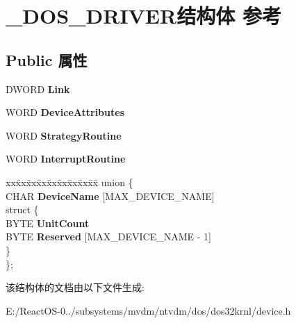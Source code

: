 \hypertarget{struct___d_o_s___d_r_i_v_e_r}{}\section{\+\_\+\+D\+O\+S\+\_\+\+D\+R\+I\+V\+E\+R结构体 参考}
\label{struct___d_o_s___d_r_i_v_e_r}
\subsection*{Public 属性}
\begin{DoxyCompactItemize}
\item 
\mbox{\label{struct___d_o_s___d_r_i_v_e_r_a3cf2f1cfe956b85175f57a898467bd11}} 
D\+W\+O\+RD {\bfseries Link}
\item 
\mbox{\label{struct___d_o_s___d_r_i_v_e_r_a692ad098eabaeef3602e1a47735b465b}} 
W\+O\+RD {\bfseries Device\+Attributes}
\item 
\mbox{\label{struct___d_o_s___d_r_i_v_e_r_a48d4d3a7468c4c65fdc1afa55d46f41b}} 
W\+O\+RD {\bfseries Strategy\+Routine}
\item 
\mbox{\label{struct___d_o_s___d_r_i_v_e_r_a710466144bf3166421014d79f834baea}} 
W\+O\+RD {\bfseries Interrupt\+Routine}
\item 
\mbox{\label{struct___d_o_s___d_r_i_v_e_r_a876d2e659b7fd28220115573c82b755b}} 
\begin{tabbing}
xx\=xx\=xx\=xx\=xx\=xx\=xx\=xx\=xx\=\kill
union \{\\
\>CHAR {\bfseries DeviceName} \mbox{[}MAX\_DEVICE\_NAME\mbox{]}\\
\mbox{\label{union___d_o_s___d_r_i_v_e_r_1_1_0D3702_a1d9fa3e559eb0e0edf40811ab83db36e}} 
\>struct \{\\
\>\>BYTE {\bfseries UnitCount}\\
\>\>BYTE {\bfseries Reserved} \mbox{[}MAX\_DEVICE\_NAME -\/ 1\mbox{]}\\
\>\} \\
\}; \\

\end{tabbing}\end{DoxyCompactItemize}


该结构体的文档由以下文件生成\+:\begin{DoxyCompactItemize}
\item 
E\+:/\+React\+O\+S-\/0../subsystems/mvdm/ntvdm/dos/dos32krnl/device.\+h\end{DoxyCompactItemize}
